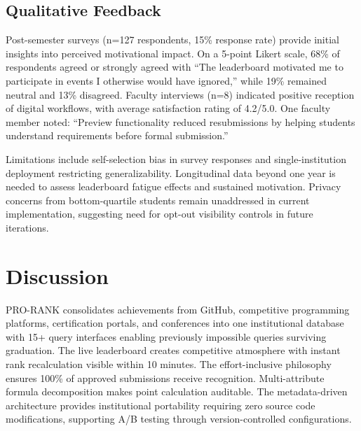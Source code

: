 \documentclass[12pt]{article}
\begin{document}
\subsection{Qualitative Feedback}
Post-semester surveys (n=127 respondents, 15\% response rate) provide initial insights into perceived motivational impact. On a 5-point Likert scale, 68\% of respondents agreed or strongly agreed with ``The leaderboard motivated me to participate in events I otherwise would have ignored,'' while 19\% remained neutral and 13\% disagreed. Faculty interviews (n=8) indicated positive reception of digital workflows, with average satisfaction rating of 4.2/5.0. One faculty member noted: ``Preview functionality reduced resubmissions by helping students understand requirements before formal submission.''

Limitations include self-selection bias in survey responses and single-institution deployment restricting generalizability. Longitudinal data beyond one year is needed to assess leaderboard fatigue effects and sustained motivation. Privacy concerns from bottom-quartile students remain unaddressed in current implementation, suggesting need for opt-out visibility controls in future iterations.


\section{Discussion}

PRO-RANK consolidates achievements from GitHub, competitive programming platforms, certification portals, and conferences into one institutional database with 15+ query interfaces enabling previously impossible queries surviving graduation. The live leaderboard creates competitive atmosphere with instant rank recalculation visible within 10 minutes. The effort-inclusive philosophy ensures 100\% of approved submissions receive recognition. Multi-attribute formula decomposition makes point calculation auditable. The metadata-driven architecture provides institutional portability requiring zero source code modifications, supporting A/B testing through version-controlled configurations.
\end{document}
